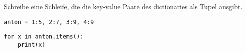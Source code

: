\question[2] Schreibe eine Schleife, die die key-value Paare des
dictionaries als Tupel ausgibt.

\texttt{anton = {1:5, 2:7, 3:9, 4:9}}

\begin{solutionbox}{2cm}
\begin{lstlisting}
for x in anton.items():
    print(x)
\end{lstlisting}
\end{solutionbox}
